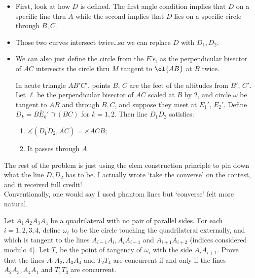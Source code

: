 \documentclass{seto}
\begin{document}
\begin{itemize}
\item First, look at how $D$ is defined. The first angle condition implies that $D$ on a specific line thru $A$
while the second implies that $D$ lies on a specific circle through $B,C$.
\item Those two curves intersect twice\dots so we can replace $D$ with $D_1,D_2$. 
\item We can also just define the circle from the $E$'s, as the perpendicular bisector of $\overline{AC}$
intersects the circle thru $M$ tangent to $\ol{AB}$ at $B$ twice. 
\begin{block}
In acute triangle $AB'C'$, points $B$, $C$ are the feet of the altitudes from $B'$, $C'$. 
Let $\ell$ be the perpendicular bisector of $\overline{AC}$ scaled at $B$ by $2$,
and circle $\omega$ be tangent to $\overline{AB}$ and through $B,C$, 
and suppose they meet at $E_1'$, $E_2'$. Define $D_k=\overline{BE_k'}\cap(BC)$ for $k=1,2$. 
Then line $D_1D_2$ satisfies:
\begin{enumerate}
\item $\measuredangle(\overline{D_1D_2},\overline{AC})=\measuredangle ACB$;
\item It passes through $A$.
\end{enumerate}
\end{block}
\end{itemize}
The rest of the problem is just using the elem construction principle to pin down what the line $D_1D_2$
has to be. I actually wrote `take the converse' on the contest, and it received full credit!\\
Conventionally, one would say I used phantom lines but `converse' felt more natural.
\begin{block}
Let $A_1A_2A_3A_4$ be a quadrilateral with no pair of parallel sides. 
For each $i=1, 2, 3, 4$, define $\omega_i$ to be 
the circle touching the quadrilateral externally, 
and which is tangent to the lines $A_{i-1}A_i, A_iA_{i+1}$ and $A_{i+1}A_{i+2}$ 
(indices considered modulo $4$). 
Let $T_i$ be the point of tangency of $\omega_i$ with the side $A_iA_{i+1}$. 
Prove that the lines $A_1A_2, A_3A_4$ and $T_2T_4$ are concurrent if and only if 
the lines $A_2A_3, A_4A_1$ and $T_1T_3$ are concurrent.
\end{block}
\end{document}
